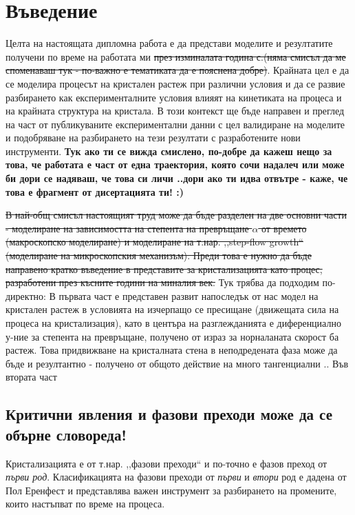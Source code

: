 \setcounter{page}{2}
\section{Въведение}
Целта на настоящата дипломна работа е да представи моделите и резултатите получени по време на работата ми \sout{през изминалата година с.(няма смисъл да ме споменаваш тук - по-важно е тематиката да е пояснена добре)}. Крайната цел е да се моделира процесът на кристален растеж при различни условия и да се развие разбирането как експерименталните условия влияят на кинетиката на процеса и на крайната структура на кристала. В този контекст ще бъде направен и преглед на част от публикуваните експериментални данни с цел валидиране на моделите и подобряване на разбирането на тези резултати с разработените нови инструменти.
\textbf{Тук ако ти се вижда смислено, по-добре да кажеш нещо за това, че работата е част от една траектория, която сочи надалеч или може би дори се надяваш, че това си личи ..дори ако ти идва отвътре - каже, че това е фрагмент от дисертацията ти! :)}

\sout{В най-общ смисъл настоящият труд може да бъде разделен на две основни части - моделиране на зависимостта на степента на превръщане $\alpha$ от времето (макроскопско моделиране) и моделиране на т.нар. ,,step-flow growth``  (моделиране на микроскопския механизъм). Преди това е нужно да бъде направено кратко въведение в представите за кристализацията като процес, разработени през късните години на миналия век.}
Тук трябва да подходим по-директно:
В първата част е представен развит напоследък от нас модел на кристален растеж в условията на изчерпащо се пресищане (движещата сила на процеса на кристализация), като в центъра на разглежданията е диференциално у-ние за степента на превръщане, получено от израз за норналаната скорост ба растеж.
Това придвижване на кристалната стена в неподредената фаза може да бъде и резултантно - получено от общото действие на много тангенциални .. Във втората част 

\subsection{Критични явления и фазови преходи може да се обърне словореда!}
Кристализацията е от т.нар. ,,фазови преходи`` и по-точно е фазов преход от \textit{първи род}. Класификацията на фазови преходи от \textit{първи} и \textit{втори} род е дадена от Пол Еренфест \cite{Jaeger1998} \cite{atkinspaula2008} и представлява важен инструмент за разбирането на промените, които настъпват по време на процеса.

